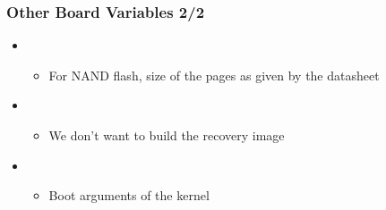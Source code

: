\begin{frame}
  \frametitle{Other Board Variables 2/2}
  \begin{itemize}
  \item {}
    \begin{itemize}
    \item For NAND flash, size of the pages as given by the datasheet
    \end{itemize}
  \item {}
    \begin{itemize}
    \item We don't want to build the recovery image
    \end{itemize}
  \item {}
    \begin{itemize}
    \item Boot arguments of the kernel
    \end{itemize}
  \end{itemize}
\end{frame}
